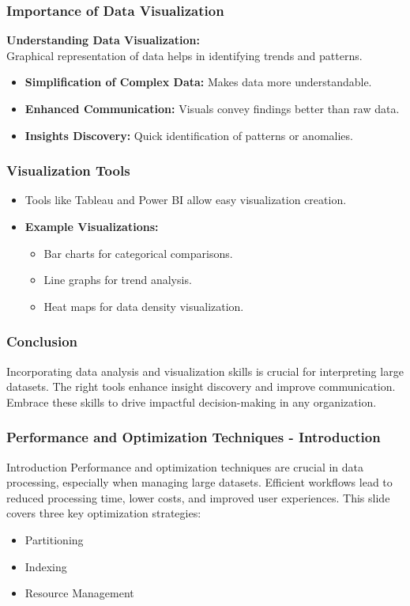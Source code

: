 \documentclass{beamer}
\begin{document}
\begin{frame}
    \frametitle{Importance of Data Visualization}
    \textbf{Understanding Data Visualization:} \\
    Graphical representation of data helps in identifying trends and patterns.

    \begin{itemize}
        \item \textbf{Simplification of Complex Data:} Makes data more understandable.
        \item \textbf{Enhanced Communication:} Visuals convey findings better than raw data.
        \item \textbf{Insights Discovery:} Quick identification of patterns or anomalies.
    \end{itemize}
\end{frame}

\begin{frame}
    \frametitle{Visualization Tools}
    \begin{itemize}
        \item Tools like Tableau and Power BI allow easy visualization creation.
        \item \textbf{Example Visualizations:}
        \begin{itemize}
            \item Bar charts for categorical comparisons.
            \item Line graphs for trend analysis.
            \item Heat maps for data density visualization.
        \end{itemize}
    \end{itemize}
\end{frame}

\begin{frame}
    \frametitle{Conclusion}
    Incorporating data analysis and visualization skills is crucial for interpreting large datasets. The right tools enhance insight discovery and improve communication. Embrace these skills to drive impactful decision-making in any organization.
\end{frame}

\begin{frame}[fragile]
    \frametitle{Performance and Optimization Techniques - Introduction}
    \begin{block}{Introduction}
        Performance and optimization techniques are crucial in data processing, especially when managing large datasets. Efficient workflows lead to reduced processing time, lower costs, and improved user experiences. This slide covers three key optimization strategies: 
        \begin{itemize}
            \item Partitioning
            \item Indexing
            \item Resource Management
        \end{itemize}
    \end{block}
\end{frame}
\end{document}
